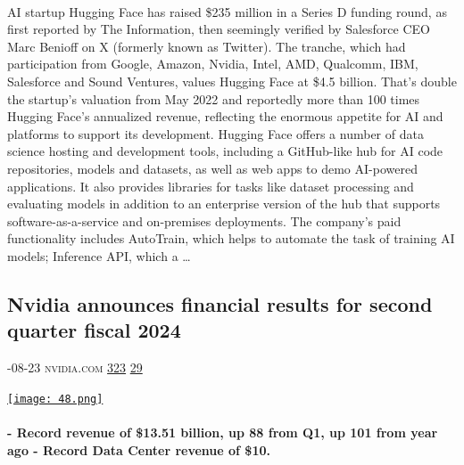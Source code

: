 \documentclass[10pt,a4paper]{article}
\begin{document}
\begin{multicols}{2}
\paragraph{}
AI startup Hugging Face has raised \$235 million in a Series D funding round, as first reported by The Information, then seemingly verified by Salesforce CEO Marc Benioff on X (formerly known as Twitter). The tranche, which had participation from Google, Amazon, Nvidia, Intel, AMD, Qualcomm, IBM, Salesforce and Sound Ventures, values Hugging Face at \$4.5 billion. That’s double the startup’s valuation from May 2022 and reportedly more than 100 times Hugging Face’s annualized revenue, reflecting the enormous appetite for AI and platforms to support its development.
Hugging Face offers a number of data science hosting and development tools, including a GitHub-like hub for AI code repositories, models and datasets, as well as web apps to demo AI-powered applications. It also provides libraries for tasks like dataset processing and evaluating models in addition to an enterprise version of the hub that supports software-as-a-service and on-premises deployments.
The company’s paid functionality includes AutoTrain, which helps to automate the task of training AI models; Inference API, which a
\dots\par
\noindent\begin{minipage}{\linewidth}
\medskip
\subsection{Nvidia announces financial results for second quarter fiscal 2024}
\textsc{\footnotesize
{\scriptsize\faCalendar}-08-23 
{\scriptsize\faGlobe}\space 
nvidia.com 
{\scriptsize\faThumbsOUp}\space 
\href{http://news.ycombinator.com/item?id=37241487\&utm\_term=comment}{323} 
{\scriptsize\faComments}\space 
\href{http://news.ycombinator.com/item?id=37241487\&utm\_term=comment}{29} 
}
\par\medskip\noindent
\href{https://nvidianews.nvidia.com/news/nvidia-announces-financial-results-for-second-quarter-fiscal-2024?utm\_source=hackernewsletter\&utm\_medium=email\&utm\_term=startup\_news}{
    \texttt{[image: 48.png]}
}
\end{minipage}
\paragraph{}
\textbf{- Record revenue of \$13.51 billion, up 88 from Q1, up 101 from year ago
- Record Data Center revenue of \$10.}

\end{multicols}
\end{document}
